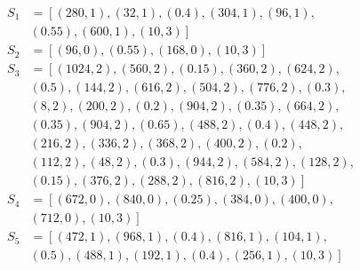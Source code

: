 \documentclass[journal]{IEEEtran}
\begin{document}
\begin{align*}
S_1 & = \left[ (280, 1), (32, 1), (0.4), (304, 1), (96, 1), \right.\\
& \left. (0.55), (600, 1), (10, 3) \right] \\
S_2 & = \left[ (96, 0), (0.55), (168, 0), (10, 3) \right] \\
S_3 & = \left[ (1024, 2), (560, 2), (0.15), (360, 2), (624, 2), \right.\\
& \left. (0.5), (144, 2), (616, 2), (504, 2), (776, 2), (0.3), \right.\\ 
& \left. (8, 2), (200, 2), (0.2), (904, 2), (0.35), (664, 2), \right.\\ 
& \left. (0.35), (904, 2), (0.65), (488, 2), (0.4), (448, 2), \right.\\
& \left. (216, 2), (336, 2), (368, 2), (400, 2), (0.2), \right.\\
& \left. (112, 2), (48, 2), (0.3), (944, 2), (584, 2), (128, 2), \right.\\
& \left. (0.15), (376, 2), (288, 2), (816, 2), (10, 3) \right] \\
S_4 & = \left[ (672, 0), (840, 0), (0.25), (384, 0), (400, 0), \right.\\
& \left. (712, 0), (10, 3) \right] \\
S_5 & = \left[ (472, 1), (968, 1), (0.4), (816, 1), (104, 1), \right.\\
& \left. (0.5), (488, 1), (192, 1), (0.4), (256, 1), (10, 3) \right] \\
\end{align*}

\end{document}
